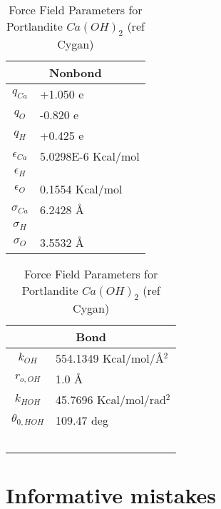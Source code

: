 \documentclass[twoside,english]{uiofysmaster}
\begin{document}
\begin{table}
 \caption{Force Field Parameters for Portlandite $Ca(OH)_2$ (ref Cygan)}
  \begin{tabular}[]{|c|l|}
  \hline
  \multicolumn{2}{|c|}{Nonbond} \\ \hline
  $q_{Ca}$ & +1.050 e  \\ \hline
  $q_O$ & -0.820 e  \\ \hline
  $q_H$ & +0.425 e  \\ \hline

  $\epsilon _{Ca}$ & 5.0298E-6 Kcal/mol \\ \hline
  $\epsilon _H$ &  \\ \hline
  $\epsilon _O$ & 0.1554 Kcal/mol \\ \hline
  $\sigma _{Ca}$ & 6.2428 \AA{} \\ \hline
  $\sigma _H$ &  \\ \hline
  $\sigma _O$ & 3.5532 \AA{} \\ \hline
 \end{tabular}
  \begin{tabular}[]{|c|l|}
  \hline
  \multicolumn{2}{|c|}{Bond} \\ \hline
  $k_{OH}$ & 554.1349 Kcal/mol/\AA{}$^2$  \\ \hline
  $r_{o,OH}$ & 1.0 \AA{}  \\ \hline
  $k_{HOH}$ & 45.7696 Kcal/mol/rad$^2$ \\ \hline
  $\theta _{0,HOH}$ & 109.47 deg \\ \hline
                    &           \\ \hline
                    &           \\ \hline
		    &           \\ \hline
                    &           \\ \hline
                    &           \\ \hline

 \end{tabular}
 \label{ForceFieldParameters_Portlandite}
\end{table}

\chapter{Informative mistakes}
\end{document}
